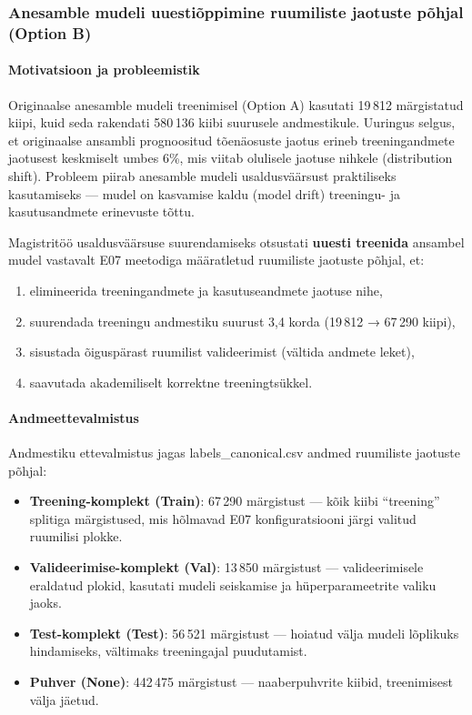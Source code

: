 \subsubsection{Anesamble mudeli uuestiõppimine ruumiliste jaotuste põhjal (Option B)}

\paragraph{Motivatsioon ja probleemistik}

Originaalse anesamble mudeli treenimisel (Option A) kasutati 19\,812 märgistatud kiipi,
kuid seda rakendati 580\,136 kiibi suurusele andmestikule. Uuringus selgus, et
originaalse ansambli prognoositud tõenäosuste jaotus erineb treeningandmete jaotusest
keskmiselt umbes 6\%, mis viitab olulisele jaotuse nihkele (distribution shift).
Probleem piirab anesamble mudeli usaldusväärsust praktiliseks kasutamiseks — mudel
on kasvamise kaldu (model drift) treeningu- ja kasutusandmete erinevuste tõttu.

Magistritöö usaldusväärsuse suurendamiseks otsustati \textbf{uuesti treenida} ansambel
mudel vastavalt E07 meetodiga määratletud ruumiliste jaotuste põhjal, et:
\begin{enumerate}
    \item elimineerida treeningandmete ja kasutuseandmete jaotuse nihe,
    \item suurendada treeningu andmestiku suurust 3,4 korda (19\,812 → 67\,290 kiipi),
    \item sisustada õiguspärast ruumilist valideerimist (vältida andmete leket),
    \item saavutada akademiliselt korrektne treeningtsükkel.
\end{enumerate}

\paragraph{Andmeettevalmistus}

Andmestiku ettevalmistus jagas labels\_canonical.csv andmed ruumiliste jaotuste põhjal:
\begin{itemize}
    \item \textbf{Treening-komplekt (Train)}: 67\,290 märgistust — kõik kiibi ``treening''
          splitiga märgistused, mis hõlmavad E07 konfiguratsiooni järgi valitud ruumilisi
          plokke.
    \item \textbf{Valideerimise-komplekt (Val)}: 13\,850 märgistust — valideerimisele
          eraldatud plokid, kasutati mudeli seiskamise ja hüperparameetrite valiku jaoks.
    \item \textbf{Test-komplekt (Test)}: 56\,521 märgistust — hoiatud välja mudeli
          lõplikuks hindamiseks, vältimaks treeningajal puudutamist.
    \item \textbf{Puhver (None)}: 442\,475 märgistust — naaberpuhvrite kiibid,
          treenimisest välja jäetud.
\end{itemize}

